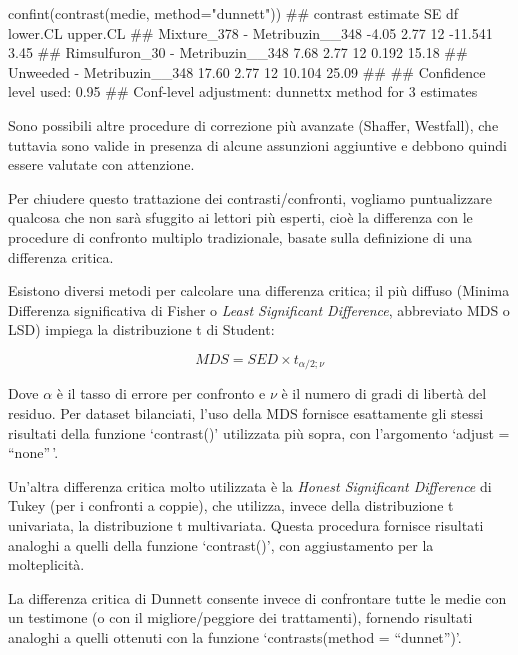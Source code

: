 \documentclass[a4paper,12pt,oneside]{book}
\newenvironment{Shaded}{}{}
\newcommand{\KeywordTok}[1]{#1}
\newcommand{\DataTypeTok}[1]{#1}
\newcommand{\StringTok}[1]{#1}
\newcommand{\CommentTok}[1]{#1}
\newcommand{\NormalTok}[1]{#1}
\begin{document}
\small

\begin{Shaded}
\begin{Highlighting}[]
\KeywordTok{confint}\NormalTok{(}\KeywordTok{contrast}\NormalTok{(medie, }\DataTypeTok{method=}\StringTok{"dunnett"}\NormalTok{))}
\CommentTok{##  contrast                         estimate   SE df lower.CL upper.CL}
\CommentTok{##  Mixture_378 - Metribuzin__348       -4.05 2.77 12  -11.541     3.45}
\CommentTok{##  Rimsulfuron_30 - Metribuzin__348     7.68 2.77 12    0.192    15.18}
\CommentTok{##  Unweeded - Metribuzin__348          17.60 2.77 12   10.104    25.09}
\CommentTok{## }
\CommentTok{## Confidence level used: 0.95 }
\CommentTok{## Conf-level adjustment: dunnettx method for 3 estimates}
\end{Highlighting}
\end{Shaded}

\normalsize

Sono possibili altre procedure di correzione più avanzate (Shaffer, Westfall), che tuttavia sono valide in presenza di alcune assunzioni aggiuntive e debbono quindi essere valutate con attenzione.

Per chiudere questo trattazione dei contrasti/confronti, vogliamo puntualizzare qualcosa che non sarà sfuggito ai lettori più esperti, cioè la differenza con le procedure di confronto multiplo tradizionale, basate sulla definizione di una differenza critica.

Esistono diversi metodi per calcolare una differenza critica; il più diffuso (Minima Differenza significativa di Fisher o \emph{Least Significant Difference}, abbreviato MDS o LSD) impiega la distribuzione t di Student:

\[ MDS = SED \times t_{\alpha/2; \nu}\]

Dove \(\alpha\) è il tasso di errore per confronto e \(\nu\) è il numero di gradi di libertà del residuo. Per dataset bilanciati, l'uso della MDS fornisce esattamente gli stessi risultati della funzione `contrast()' utilizzata più sopra, con l'argomento `adjust = ``none''\,'.

Un'altra differenza critica molto utilizzata è la \emph{Honest Significant Difference} di Tukey (per i confronti a coppie), che utilizza, invece della distribuzione t univariata, la distribuzione t multivariata. Questa procedura fornisce risultati analoghi a quelli della funzione `contrast()', con aggiustamento per la molteplicità.

La differenza critica di Dunnett consente invece di confrontare tutte le medie con un testimone (o con il migliore/peggiore dei trattamenti), fornendo risultati analoghi a quelli ottenuti con la funzione `contrasts(method = ``dunnet'')'.
\end{document}
